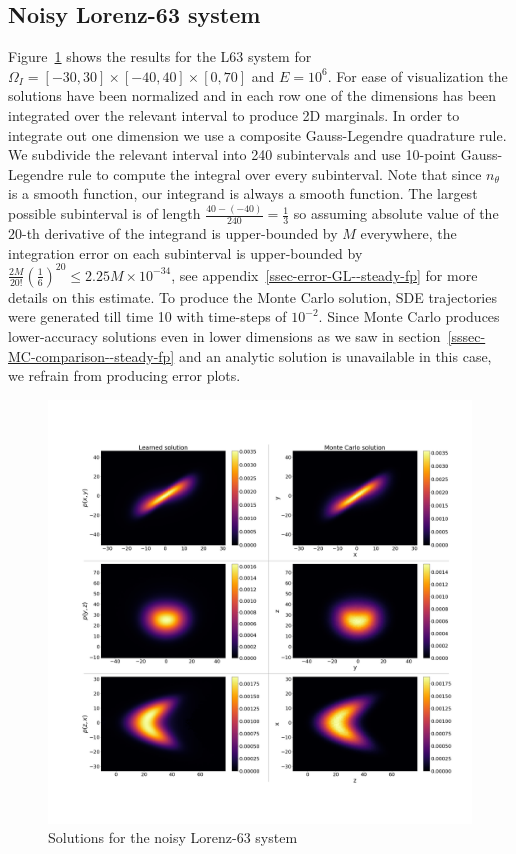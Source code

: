 \subsection{Noisy Lorenz-63 system} Figure~\ref{fig:L63-steady--steady-fp} shows the results for the L63 system for $\Omega_I = [-30, 30]\times[-40, 40]\times[0, 70]$ and $E=10^6$. For ease of visualization the solutions have been normalized and in each row one of the dimensions has been integrated over the relevant interval to produce 2D marginals. In order to integrate out one dimension we use a composite Gauss-Legendre quadrature rule. We subdivide the relevant interval into 240 subintervals and use 10-point Gauss-Legendre rule to compute the integral over every subinterval. Note that since $n_\theta$ is a smooth function, our integrand is always a smooth function. The largest possible subinterval is of length $\frac{40-(-40)}{240}=\frac{1}{3}$ so assuming absolute value of the $20$-th derivative of the integrand is upper-bounded by $M$ everywhere, the integration error on each subinterval is upper-bounded by $\frac{2M}{20!}\left(\frac{1}{6}\right)^{20}\le2.25M\times10^{-34}$, see appendix~\ref{ssec-error-GL--steady-fp} for more details on this estimate. To produce the Monte Carlo solution, SDE trajectories were generated till time 10 with time-steps of $10^{-2}$. 
Since Monte Carlo produces lower-accuracy solutions even in lower dimensions as we saw in section~\ref{sssec-MC-comparison--steady-fp} and an analytic solution is unavailable in this case, we refrain from producing error plots.

\begin{figure}[!ht]
    \centering\includegraphics[scale=0.21]{steady-fp/plots/steady-plots-L63-steady.png}  \caption{Solutions for the noisy Lorenz-63 system}
    \label{fig:L63-steady--steady-fp}
\end{figure}

